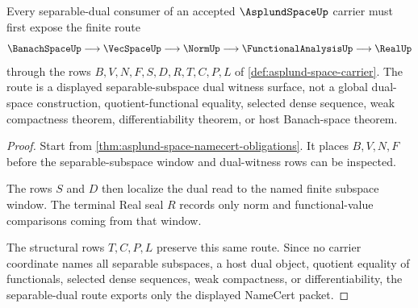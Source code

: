 \begin{theorem}
\label{thm:asplund-space-separable-dual-route}
Every separable-dual consumer of an accepted $\AsplundSpaceUp$ carrier must first expose the finite route
$$
\BanachSpaceUp \longrightarrow \VecSpaceUp \longrightarrow \NormUp \longrightarrow \FunctionalAnalysisUp \longrightarrow \RealUp
$$
through the rows $B,V,N,F,S,D,R,T,C,P,L$ of \autoref{def:asplund-space-carrier}. The route is a displayed separable-subspace dual witness surface, not a global dual-space construction, quotient-functional equality, selected dense sequence, weak compactness theorem, differentiability theorem, or host Banach-space theorem.
\end{theorem}
\begin{proof}
Start from \autoref{thm:asplund-space-namecert-obligations}. It places $B,V,N,F$ before the separable-subspace window and dual-witness rows can be inspected.

The rows $S$ and $D$ then localize the dual read to the named finite subspace window. The terminal Real seal $R$ records only norm and functional-value comparisons coming from that window.

The structural rows $T,C,P,L$ preserve this same route. Since no carrier coordinate names all separable subspaces, a host dual object, quotient equality of functionals, selected dense sequences, weak compactness, or differentiability, the separable-dual route exports only the displayed NameCert packet.
\end{proof}




